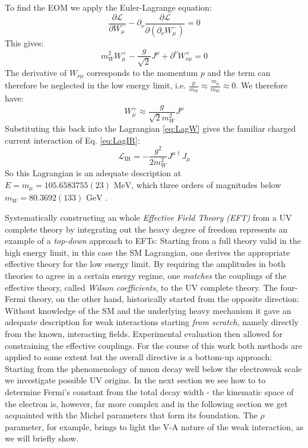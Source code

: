 To find the EOM we apply the Euler-Lagrange equation:
\begin{equation}
    \frac{\partial \mathcal{L}}{\partial W_\mu^-} - \partial_\nu \frac{\partial \mathcal{L}}{\partial (\partial_\nu W_\mu^-)} = 0
\end{equation}
This gives:
\begin{equation}
    m_W^2 W_\mu^+ - \frac{g}{\sqrt{2}} J^\mu + \partial^\nu W_{\nu\mu}^+ = 0
\end{equation}
The derivative of $W_{\nu\mu}$ corresponds to the momentum $p$ and the term can therefore be neglected in the low energy limit, i.e. $\tfrac{p}{m_W}\approx\tfrac{m_\mu}{m_W}\approx 0$. We therefore have:
\begin{equation}
    W_\mu^+ \approx \frac{g}{\sqrt{2} m_W^2} J^\mu
\end{equation}
Substituting this back into the Lagrangian \ref{eq:LagW} gives the familiar charged current interaction of Eq. \ref{eq:LagIR}:
\begin{equation}
    \mathcal{L}_\text{IR} = - \frac{g^2}{2 m_W^2} J^{\mu \dagger} J_\mu
\end{equation}
So this Lagrangian is an adequate description at $E=m_\mu=105.6583755(23)\text{ MeV}$, which three orders of magnitudes below $m_W=80.3692(133)\text{ GeV}$ \cite{particle2024review}.\par 
Systematically constructing an whole \textit{Effective Field Theory (EFT)} from a UV complete theory by integrating out the heavy degree of freedom represents an example of a \textit{top-down} approach to EFTs: Starting from a full theory valid in the high energy limit, in this case the SM Lagrangian, one derives the appropriate effective theory for the low energy limit. By requiring the amplitudes in both theories to agree in a certain energy regime, one \textit{matches} the couplings of the effective theory, called \textit{Wilson coefficients}, to the UV complete theory. The four-Fermi theory, on the other hand, historically started from the opposite direction: Without knowledge of the SM and the underlying heavy mechanism it gave an adequate description for weak interactions starting \textit{from scratch}, namely directly from the known, interacting fields. Experimental evaluation then allowed for constraining the effective couplings. For the course of this work both methods are applied to some extent but the overall directive is a bottom-up approach: Starting from the phenomenology of muon decay well below the electroweak scale we investigate possible UV origins. In the next section we see how to to determine Fermi's constant from the total decay width - the kinematic space of the electron is, however, far more complex and in the following section we get acquainted with the Michel parameters that form its foundation. The $\rho$ parameter, for example, brings to light the V-A nature of the weak interaction, as we will briefly show.
